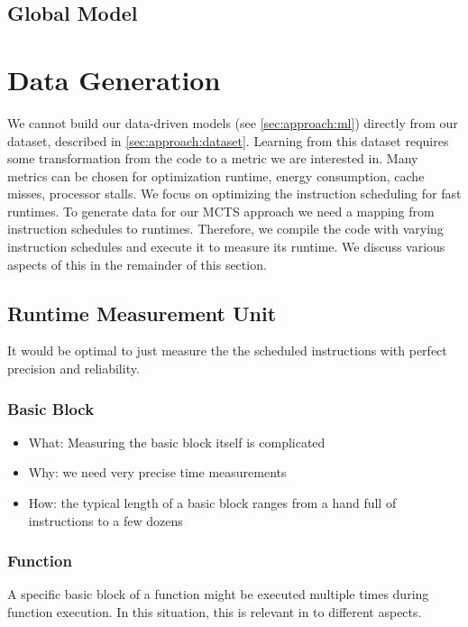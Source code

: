 \subsection{Global Model}
\label{subsec:approach:ml:global}

\section{Data Generation}
We cannot build our data-driven models (see \cref{sec:approach:ml}) directly from our dataset, described in \cref{sec:approach:dataset}.
Learning from this dataset requires some transformation from the code to a metric we are interested in.
Many metrics can be chosen for optimization \eg runtime, energy consumption, cache misses, processor stalls.
We focus on optimizing the instruction scheduling for fast runtimes.
To generate data for our MCTS approach we need a mapping from instruction schedules to runtimes.
Therefore, we compile the code with varying instruction schedules and execute it to measure its runtime.
We discuss various aspects of this in the remainder of this section.

\subsection{Runtime Measurement Unit}
It would be optimal to just measure the the scheduled instructions with perfect precision and reliability.
\subsubsection{Basic Block}
\begin{itemize}
    \item What: Measuring the basic block itself is complicated
    \item Why: we need very precise time measurements
    \item How: the typical length of a basic block ranges from a hand full of instructions to a few dozens
\end{itemize}
\subsubsection{Function}
\label{sec:approach:datageneration:runtime:function}
A specific basic block of a function might be executed multiple times during function execution.
In this situation, this is relevant in to different aspects.

